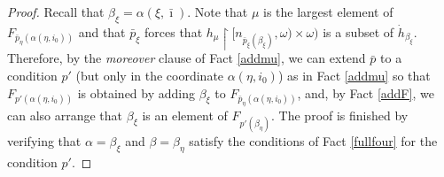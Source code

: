 \documentclass[10pt,a4paper]{amsart}
\begin{document}
\begin{proof}
  Recall that $\beta_\xi = \alpha(\xi, \bar\imath)$.
Note that $\mu$ is the largest element of $F_{\bar p_\eta(\alpha(\eta,i_0))}$
and that $\bar p_\xi$ forces that
     $ h_\mu\restriction [n_{\bar p_\xi(\beta_\xi)},\omega)
     \times\omega)$ is a subset of $\dot h_{\beta_\xi}$.     
     Therefore, by the \textit{moreover} clause of Fact \ref{addmu},
     we can extend $\bar p $ 
     to a condition $p'$ (but only in the coordinate
      $\alpha(\eta,i_0)$) as in Fact \ref{addmu} so
      that $F_{p'(\alpha(\eta,i_0))}$ is obtained
      by   adding  $\beta_\xi$ to $F_{\bar p_\eta(\alpha(\eta,i_0))}$,
      and, by Fact \ref{addF}, we can also arrange
      that $\beta_\xi $ is an element
      of $F_{  p' (\beta_\eta)}$. 
      The proof is finished by verifying
      that $\alpha  = \beta_\xi $ and $\beta = \beta_\eta$
      satisfy the conditions of Fact \ref{fullfour} for
      the condition $p'$.
         \end{proof}
\end{document}
